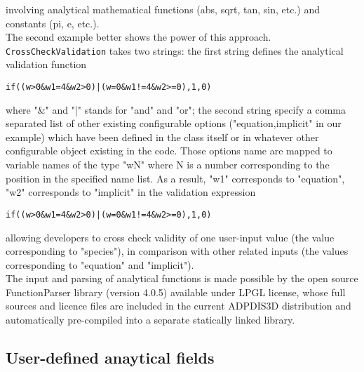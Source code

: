\documentclass[11pt]{article}
\begin{document}
involving analytical mathematical functions (abs, sqrt, tan, sin,
etc.) and constants (pi, e, etc.). \\
The second example better shows the power of this approach.
\texttt{CrossCheckValidation} takes two strings: the first string defines
the analytical validation function
\begin{verbatim}
if((w>0&w1=4&w2>0)|(w=0&w1!=4&w2>=0),1,0)
\end{verbatim}
where "\&" and "|" stands for "and" and "or"; the second string
specify a comma separated list of other existing configurable 
options ("equation,implicit" in our example) which have been 
defined in the class itself or in whatever other configurable object
existing in the code. Those options name are mapped to variable names
of the type "wN" where N is a number corresponding to the position 
in the specified name list. As a result,  "w1" corresponds to "equation", "w2"
corresponds to "implicit" in the validation expression 
\begin{verbatim}
if((w>0&w1=4&w2>0)|(w=0&w1!=4&w2>=0),1,0)
\end{verbatim}
allowing developers to cross check validity of one user-input value
(the value corresponding to "species"), in comparison with other related 
inputs (the values corresponding to "equation" and "implicit").\\
The input and parsing of analytical functions is made possible by the
open source FunctionParser library (version 4.0.5) \cite{FParser} 
available under LPGL license, whose full sources and licence files are
included in the current ADPDIS3D distribution and automatically
pre-compiled into a separate statically linked library.

\subsection{User-defined anaytical fields}
\end{document}
